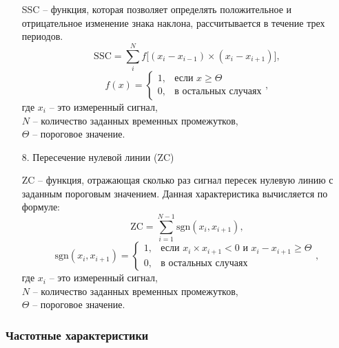 \begin{itemize}[parsep=0.4em]
        SSC – функция, которая позволяет определять положительное и отрицательное изменение знака наклона, рассчитывается в течение трех периодов.
        \begin{equation}
            \text{SSC} = \sum\limits_{i}^{N} f\bigl[(x_i-x_{i-1})\times(x_i-x_{i+1})\bigr],
        \end{equation}
        \begin{equation}
            f(x)=
            \begin{cases}
                1, & \text{если } x \geq \Theta\\
                0, & \text{в остальных случаях}
            \end{cases},
        \end{equation}
        где $x_i$ -- это измеренный сигнал,\\ \phantom{где} $N$ -- количество заданных временных промежутков,\\ \phantom{где} $\Theta$ -- пороговое значение. 

    \item[8.] Пересечение нулевой линии (ZC)

        ZC – функция, отражающая сколько раз сигнал пересек нулевую линию с заданным пороговым значением. Данная характеристика вычисляется по формуле:
        \begin{equation}
            \text{ZC} = \sum\limits_{i=1}^{N-1} \text{sgn}(x_i,x_{i+1}),
        \end{equation}
        \begin{equation}
            \text{sgn}(x_i,x_{i+1}) =
            \begin{cases}
                1, & \text{если } x_i\times x_{i+1}<0 \text{ и } x_i-x_{i+1} \geq \Theta\\ 
                0, & \text{в остальных случаях}
            \end{cases},
        \end{equation}
        где $x_i$ -- это измеренный сигнал,\\ \phantom{где} $N$ -- количество заданных временных промежутков,\\ \phantom{где} $\Theta$ -- пороговое значение. 

\end{itemize}

\subsubsection{Частотные характеристики}

